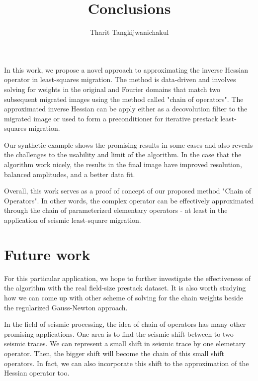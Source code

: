 \title{Conclusions}
\author{Tharit Tangkijwanichakul}
\label{ch:chapter-conclusion}

\maketitle



In this work, we propose a novel approach to approximating the inverse Hessian operator in least-squares migration. The method is data-driven and involves solving for weights in the original and Fourier domains that match two subsequent migrated images using the method called "chain of operators". The approximated inverse Hessian can be apply either as a decovolution filter to the migrated image or used to form a preconditioner for iterative prestack least-squares migration.

 Our synthetic example shows the promising results in some cases and also reveals the challenges to the usability and limit of the algorithm. In the case that the algorithm work nicely, the results in the final image have improved resolution, balanced amplitudes, and a better data fit.

 Overall, this work serves as a proof of concept of our proposed method "Chain of Operators". In other words, the complex operator can be effectively approximated through the chain of parameterized elementary operators - at least in the application of seismic least-square migration.



\section{Future work}
For this particular application, we hope to further investigate the effectiveness of the algorithm with the real field-size prestack dataset. It is also worth studying how we can come up with other scheme of solving for the chain weights beside the regularized Gauss-Newton approach.

In the field of seismic processing, the idea of chain of operators has many other promising applications. One area is to find the seismic shift between to two seismic traces. We can represent a small shift in seismic trace by one elemetary operator. Then, the bigger shift will become the chain of this small shift operators. In fact, we can also incorporate this shift to the approximation of the Hessian operator too.


